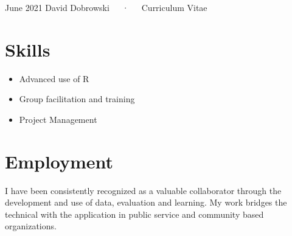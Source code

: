 \documentclass[11pt, a4paper]{awesome-cv}
\providecommand{\tightlist}{%
	\setlength{\itemsep}{0pt}\setlength{\parskip}{0pt}}
\begin{document}
\makecvheader

\makecvfooter
  {June 2021}
    {David Dobrowski~~~·~~~Curriculum Vitae}
  {\thepage}





\hypertarget{skills}{%
\section{Skills}\label{skills}}

\begin{itemize}
\tightlist
\item
  Advanced use of R
\item
  Group facilitation and training
\item
  Project Management
\end{itemize}

\hypertarget{employment}{%
\section{Employment}\label{employment}}

\footnotesize

I have been consistently recognized as a valuable collaborator through
the development and use of data, evaluation and learning. My work
bridges the technical with the application in public service and
community based organizations.
\end{document}
